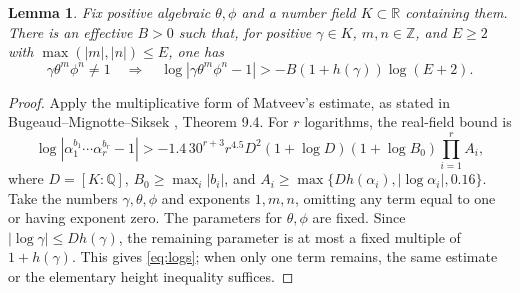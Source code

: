 \documentclass[11pt]{article}
\newtheorem{lemma}[theorem]{Lemma}
\newcommand{\Q}{\mathbb Q}
\newcommand{\Z}{\mathbb Z}
\newcommand{\R}{\mathbb R}
\begin{document}
\begin{lemma}\label{lem:logs}
Fix positive algebraic $\theta,\phi$ and a number field
$K\subset\R$ containing them. There is an effective $B>0$ such that,
for positive $\gamma\in K$, $m,n\in\Z$, and $E\geq2$ with
$\max(|m|,|n|)\leq E$, one has
\begin{equation}\label{eq:logs}
 \gamma\theta^m\phi^n\ne1\quad\Longrightarrow\quad
 \log|\gamma\theta^m\phi^n-1|
 >-B(1+h(\gamma))\log(E+2).
\end{equation}
\end{lemma}
\begin{proof}
Apply the multiplicative form of Matveev's estimate, as stated in
Bugeaud--Mignotte--Siksek \cite{BMS}, Theorem 9.4. For $r$ logarithms,
the real-field bound is
\[
 \log|\alpha_1^{b_1}\cdots\alpha_r^{b_r}-1|
 >-1.4\,30^{r+3}r^{4.5}D^2(1+\log D)(1+\log B_0)
       \prod_{i=1}^r A_i,
\]
where $D=[K:\Q]$, $B_0\geq\max_i|b_i|$, and
$A_i\geq\max\{Dh(\alpha_i),|\log\alpha_i|,0.16\}$.
Take the numbers $\gamma,\theta,\phi$ and exponents $1,m,n$,
omitting any term equal to one or having exponent zero. The parameters
for $\theta,\phi$ are fixed. Since $|\log\gamma|\leq Dh(\gamma)$,
the remaining parameter is at most a fixed multiple of $1+h(\gamma)$.
This gives \eqref{eq:logs}; when only one term remains, the same estimate
or the elementary height inequality suffices.
\end{proof}
\end{document}
